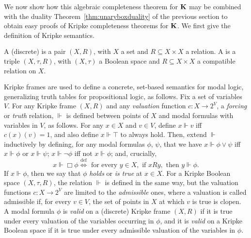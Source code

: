 We now show how this algebraic completeness theorem for $\mathbf{K}$ may be combined with the duality Theorem~\ref{thm:unaryboxduality} of the previous section to obtain easy proofs of Kripke completeness theorems for $\mathbf{K}$. We first give the definition of Kripke semantics.
\begin{definition}
A (discrete)  is a pair $(X, R)$, with $X$ a set and $R \subseteq X \times X$ a relation. A  is a triple $(X, \tau, R)$, with $(X,\tau)$ a Boolean space and $R \subseteq X \times X$ a compatible relation on $X$.
\end{definition}
Kripke frames are used to define a concrete, set-based semantics for modal logic, generalizing truth tables for propositional logic, as follows. Fix a set of variables $V$. For any Kripke frame $(X,R)$ and any \emph{valuation} function $c \colon X \to 2^V$, a \emph{forcing} or \emph{truth} relation, $\Vdash$ is defined between points of $X$ and modal formulas with variables in $V$, as follows. For any $x \in X$ and $v \in V$, define $x \Vdash v$ iff $c(x)(v) = 1$, and also define $x \Vdash \top$ to always hold. Then, extend $\Vdash$ inductively by defining, for any modal formulas $\phi$, $\psi$, that we have $x \Vdash \phi \vee \psi$ iff $x \Vdash \phi$ or $x \Vdash \psi$; $x \Vdash \neg \phi$ iff not $x \Vdash \phi$; and, crucially,
\begin{equation}\label{eq:box-semantics}
	x \Vdash \Box \phi \stackrel{\mathrm{def}}{\iff} \text{ for every } y \in X, \text{ if } x {R} y, \text{ then } y \Vdash \phi.
\end{equation}
If $x \Vdash \phi$, then we say that $\phi$ \emph{holds} or \emph{is true} at $x \in X$. For a  Kripke Boolean space $(X, \tau, R)$, the relation $\Vdash$ is defined in the same way, but the valuation functions $c \colon X \to 2^V$ are limited to the \emph{admissible} ones, where a valuation is called admissible if, for every $v \in V$, the set of points in $X$ at which $v$ is true is clopen. A modal formula $\phi$ is \emph{valid} on a (discrete) Kripke frame $(X,R)$ if it is true under every valuation of the variables occurring in $\phi$, and it is \emph{valid} on a Kripke Boolean space if it is true under every admissible valuation of the variables in $\phi$.
